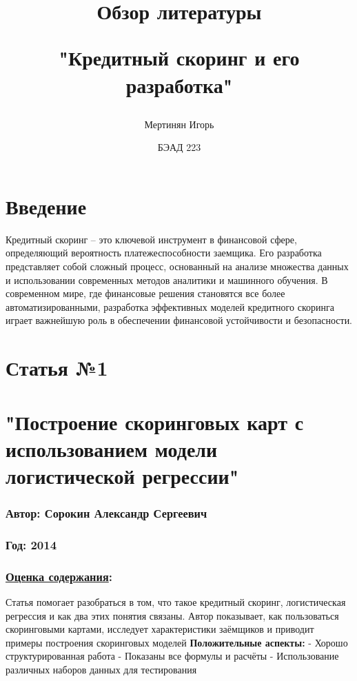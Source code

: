 \documentclass[a4paper,14pt]{article}
\title{\begin{center} Обзор литературы \end{center} \newline "Кредитный скоринг и его разработка" }
\author{Мертинян Игорь}
\date{БЭАД 223}
\begin{document}
\maketitle

\section*{Введение}
Кредитный скоринг – это ключевой инструмент в финансовой сфере, определяющий вероятность платежеспособности заемщика. Его разработка представляет собой сложный процесс, основанный на анализе множества данных и использовании современных методов аналитики и машинного обучения. В современном мире, где финансовые решения становятся все более автоматизированными, разработка эффективных моделей кредитного скоринга играет важнейшую роль в обеспечении финансовой устойчивости и безопасности.

\newpage
\section*{Статья №1}
\section*{"Построение скоринговых карт с использованием модели логистической регрессии"}
\subsubsection*{Автор: Сорокин Александр Сергеевич}
\subsubsection*{Год: 2014}
\vspace{14pt}
\subsubsection*{\underline{Оценка содержания}:}
Статья помогает разобраться в том, что такое кредитный скоринг, логистическая регрессия и как два этих понятия связаны. Автор показывает, как пользоваться скоринговыми картами, исследует характеристики заёмщиков и приводит примеры построения скоринговых моделей \newline
\textbf{Положительные аспекты:} \newline
- Хорошо структурированная работа \newline
- Показаны все формулы и расчёты \newline
- Использование различных наборов данных для тестирования \newline
\end{document}
